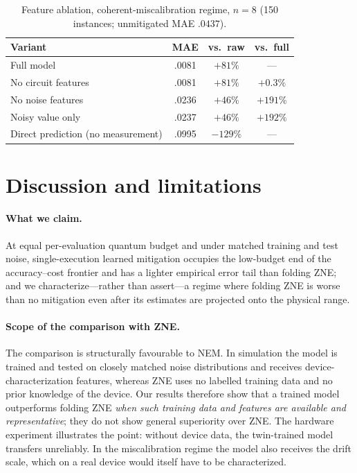 \documentclass[11pt]{article}
\begin{document}
\begin{table}[t]
\caption{Feature ablation, coherent-miscalibration regime, $n{=}8$ (150 instances; unmitigated MAE $.0437$).}
\label{tab:ablation}
\centering
\small
\begin{tabular}{lccc}
\toprule
Variant & MAE & vs.\ raw & vs.\ full \\
\midrule
Full model & .0081 & $+81\%$ & --- \\
No circuit features & .0081 & $+81\%$ & $+0.3\%$ \\
No noise features & .0236 & $+46\%$ & $+191\%$ \\
Noisy value only & .0237 & $+46\%$ & $+192\%$ \\
Direct prediction (no measurement) & .0995 & $-129\%$ & --- \\
\bottomrule
\end{tabular}
\end{table}

\section{Discussion and limitations}
\label{sec:discussion}

\paragraph{What we claim.}
At equal per-evaluation quantum budget and under matched training and test noise, single-execution learned mitigation occupies the low-budget end of the accuracy--cost frontier and has a lighter empirical error tail than folding ZNE; and we characterize---rather than assert---a regime where folding ZNE is worse than no mitigation even after its estimates are projected onto the physical range.

\paragraph{Scope of the comparison with ZNE.}
The comparison is structurally favourable to NEM. In simulation the model is trained and tested on closely matched noise distributions and receives device-characterization features, whereas ZNE uses no labelled training data and no prior knowledge of the device. Our results therefore show that a trained model outperforms folding ZNE \emph{when such training data and features are available and representative}; they do not show general superiority over ZNE. The hardware experiment illustrates the point: without device data, the twin-trained model transfers unreliably. In the miscalibration regime the model also receives the drift scale, which on a real device would itself have to be characterized.
\end{document}
